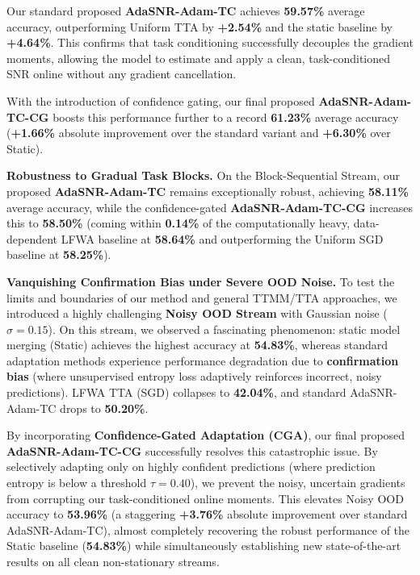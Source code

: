 \documentclass{article}
\theoremstyle{plain}
\theoremstyle{definition}
\theoremstyle{remark}
\begin{document}
Our standard proposed \textbf{AdaSNR-Adam-TC} achieves \textbf{59.57\%} average accuracy, outperforming Uniform TTA by \textbf{+2.54\%} and the static baseline by \textbf{+4.64\%}. This confirms that task conditioning successfully decouples the gradient moments, allowing the model to estimate and apply a clean, task-conditioned SNR online without any gradient cancellation.

With the introduction of confidence gating, our final proposed \textbf{AdaSNR-Adam-TC-CG} boosts this performance further to a record \textbf{61.23\%} average accuracy (\textbf{+1.66\%} absolute improvement over the standard variant and \textbf{+6.30\%} over Static).

\textbf{Robustness to Gradual Task Blocks.} On the Block-Sequential Stream, our proposed \textbf{AdaSNR-Adam-TC} remains exceptionally robust, achieving \textbf{58.11\%} average accuracy, while the confidence-gated \textbf{AdaSNR-Adam-TC-CG} increases this to \textbf{58.50\%} (coming within \textbf{0.14\%} of the computationally heavy, data-dependent LFWA baseline at \textbf{58.64\%} and outperforming the Uniform SGD baseline at \textbf{58.25\%}).

\textbf{Vanquishing Confirmation Bias under Severe OOD Noise.} To test the limits and boundaries of our method and general TTMM/TTA approaches, we introduced a highly challenging \textbf{Noisy OOD Stream} with Gaussian noise ($\sigma = 0.15$). On this stream, we observed a fascinating phenomenon: static model merging (Static) achieves the highest accuracy at \textbf{54.83\%}, whereas standard adaptation methods experience performance degradation due to \textbf{confirmation bias} (where unsupervised entropy loss adaptively reinforces incorrect, noisy predictions). LFWA TTA (SGD) collapses to \textbf{42.04\%}, and standard AdaSNR-Adam-TC drops to \textbf{50.20\%}.

By incorporating \textbf{Confidence-Gated Adaptation (CGA)}, our final proposed \textbf{AdaSNR-Adam-TC-CG} successfully resolves this catastrophic issue. By selectively adapting only on highly confident predictions (where prediction entropy is below a threshold $\tau = 0.40$), we prevent the noisy, uncertain gradients from corrupting our task-conditioned online moments. This elevates Noisy OOD accuracy to \textbf{53.96\%} (a staggering \textbf{+3.76\%} absolute improvement over standard AdaSNR-Adam-TC), almost completely recovering the robust performance of the Static baseline (\textbf{54.83\%}) while simultaneously establishing new state-of-the-art results on all clean non-stationary streams.
\end{document}
